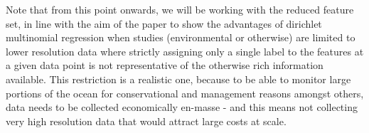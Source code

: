 Note that from this point onwards, we will be working with the reduced feature set, in line with the aim of the paper to show the advantages of dirichlet multinomial regression when studies (environmental or otherwise) are limited to lower resolution data where strictly assigning only a single label to the features at a given data point is not representative of the otherwise rich information available. This restriction is a realistic one, because to be able to monitor large portions of the ocean for conservational and management reasons amongst others, data needs to be collected economically en-masse - and this means not collecting very high resolution data that would attract large costs at scale.

% 

